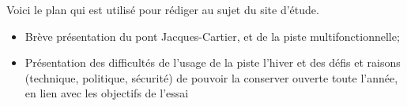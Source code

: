 \par Voici le plan qui est utilisé pour rédiger au sujet du site d'étude.
\begin{itemize}
   \item Brève présentation du pont Jacques-Cartier, et de la piste multifonctionnelle;
   \item Présentation des difficultés de l'usage de la piste l'hiver et des défis et raisons (technique, politique, sécurité) de pouvoir la conserver ouverte toute l'année, en lien avec les objectifs de l'essai 
\end{itemize}
\vspace{1\baselineskip}
\par 